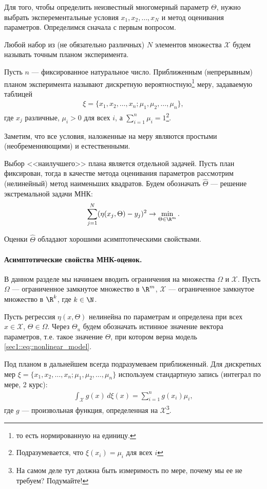 Для того, чтобы определить неизвестный многомерный параметр $\Theta$, нужно выбрать эксперементальные условия $x_1, x_2, \ldots, x_N$ и метод
оценивания параметров. Определимся сначала с первым вопросом.
\begin{dfn}
    Любой набор из (не обязательно различных) $N$ элементов множества $\mathcal X$ будем называть точным планом эксперимента.
\end{dfn}
\begin{dfn}
    Пусть $n$ --- фиксированное натуральное число.
    Приближенным (непрерывным) планом эксперимента называют дискретную вероятностную\footnote{то есть нормированную на единицу.} меру, задаваемую таблицей
    \begin{gather}
        \xi = \{x_1, x_2, \ldots, x_n; \mu_1, \mu_2, \ldots, \mu_n\},
    \end{gather}
    где $x_j$ различные, $\mu_i > 0$ для всех $i$, а $\sum_{i=1}^n \mu_i = 1$\footnote{Подразумевается, что $\xi(x_i) = \mu_i$ для всех $i$}.
\end{dfn}
Заметим, что все условия, наложенные на меру являются простыми (необременняющими) и естественными.

Выбор <<наилучшего>> плана является отдельной задачей. Пусть план фиксирован, тогда в качестве метода оценивания параметров рассмотрим (нелинейный)
метод наименьших квадратов.
Будем обозначать $\hat \Theta$ --- решение экстремальной задачи МНК:
\begin{gather*}
    \sum_{j = 1}^N (\eta(x_j, \Theta) - y_j)^2 \to \min_{\Theta \in \R^m}.
\end{gather*}

Оценки $\hat \Theta$ обладают хорошими асимптотическими свойствами.

\paragraph{Асимптотические свойства МНК-оценок.}
В данном разделе мы начинаем вводить ограничения на множества $\Omega$ и $\mathcal X$.
Пусть $\Omega$ --- ограниченное замкнутое множество в $\R^m$, $\mathcal X$ --- ограниченное замкнутое множество в $\R^k$,
где $k \in \N$.

Пусть регрессия $\eta(x, \Theta)$ нелинейна по параметрам и определена при всех $x \in \mathcal X$, $\Theta \in \Omega$.
Через $\Theta_u$ будем обозначать истинное значение вектора параметров, т.е. такое значение $\Theta$, при котором верна модель
\eqref{sec1::eq::nonlinear_model}.

Под планом в дальнейшем всегда подразумеваем приближенный. Для дискретных мер $\xi = \{x_1, x_2, \ldots, x_n; \mu_1, \mu_2, \ldots, \mu_n\}$
используем стандартную запись (интеграл по мере, 2 курс):
\begin{gather*}
\int_\mathcal X g(x)\, d\xi(x) = \sum_{i = 1}^n g(x_i) \mu_i,
\end{gather*}
где $g$ --- произвольная функция, определенная на $\mathcal X$\footnote{На самом деле тут должна быть измеримость по мере, почему мы ее не требуем? Подумайте!}.

